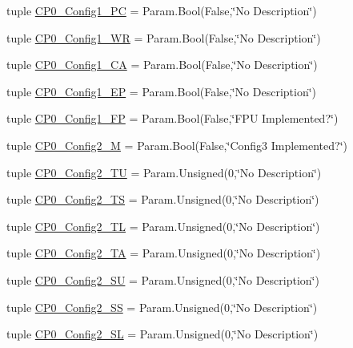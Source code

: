 \begin{DoxyCompactItemize}
\item 
tuple \hyperlink{classMipsCPU_1_1BaseMipsCPU_a97539887d1811697a726dfb4e531f8f4}{CP0\_\-Config1\_\-PC} = Param.Bool(False,\char`\"{}No Description\char`\"{})
\item 
tuple \hyperlink{classMipsCPU_1_1BaseMipsCPU_af6cad75219ec70f7eac3771410ba2370}{CP0\_\-Config1\_\-WR} = Param.Bool(False,\char`\"{}No Description\char`\"{})
\item 
tuple \hyperlink{classMipsCPU_1_1BaseMipsCPU_aaeff852b614f4308b401eff35b4f81a7}{CP0\_\-Config1\_\-CA} = Param.Bool(False,\char`\"{}No Description\char`\"{})
\item 
tuple \hyperlink{classMipsCPU_1_1BaseMipsCPU_a2025f5f700685399c54697216521338e}{CP0\_\-Config1\_\-EP} = Param.Bool(False,\char`\"{}No Description\char`\"{})
\item 
tuple \hyperlink{classMipsCPU_1_1BaseMipsCPU_a0fbf522dc1850880783779f272ee77f4}{CP0\_\-Config1\_\-FP} = Param.Bool(False,\char`\"{}FPU Implemented?\char`\"{})
\item 
tuple \hyperlink{classMipsCPU_1_1BaseMipsCPU_acb8e6fbe796168bf9985cd93259df5a9}{CP0\_\-Config2\_\-M} = Param.Bool(False,\char`\"{}Config3 Implemented?\char`\"{})
\item 
tuple \hyperlink{classMipsCPU_1_1BaseMipsCPU_ab3e9ceb3ef7cffcd31cee879d050dbeb}{CP0\_\-Config2\_\-TU} = Param.Unsigned(0,\char`\"{}No Description\char`\"{})
\item 
tuple \hyperlink{classMipsCPU_1_1BaseMipsCPU_ab8c0e1f83f50f78f543fe1adf31af3d8}{CP0\_\-Config2\_\-TS} = Param.Unsigned(0,\char`\"{}No Description\char`\"{})
\item 
tuple \hyperlink{classMipsCPU_1_1BaseMipsCPU_aff1da39b3e8559fbe0df5ed951bfbea8}{CP0\_\-Config2\_\-TL} = Param.Unsigned(0,\char`\"{}No Description\char`\"{})
\item 
tuple \hyperlink{classMipsCPU_1_1BaseMipsCPU_aa29587ae710f53b37f05bf85275b1f83}{CP0\_\-Config2\_\-TA} = Param.Unsigned(0,\char`\"{}No Description\char`\"{})
\item 
tuple \hyperlink{classMipsCPU_1_1BaseMipsCPU_a9069a5a32d904206d9512619e0e5b6b2}{CP0\_\-Config2\_\-SU} = Param.Unsigned(0,\char`\"{}No Description\char`\"{})
\item 
tuple \hyperlink{classMipsCPU_1_1BaseMipsCPU_ab97cbbcf21b6e230918b18b06994a27f}{CP0\_\-Config2\_\-SS} = Param.Unsigned(0,\char`\"{}No Description\char`\"{})
\item 
tuple \hyperlink{classMipsCPU_1_1BaseMipsCPU_a9454f5e6694924d587b7b8a754a11d1b}{CP0\_\-Config2\_\-SL} = Param.Unsigned(0,\char`\"{}No Description\char`\"{})

\end{DoxyCompactItemize}
